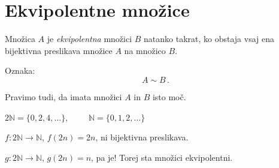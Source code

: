 \documentclass[11pt,paper=b5,footinclude,headinclude]{scrbook} %
\newcounter{example}
\begin{document}
\section{Ekvipolentne množice}

Množica $A$ je {\em ekvipolentna} množici $B$ natanko takrat, ko obstaja vsaj ena bijektivna preslikava
množice $A$ na množico $B$.

Oznaka: $$A\sim B\,.$$

Pravimo tudi, da imata množici $A$ in $B$ isto moč.

\bigskip

\begin{example*}

$2\mathbb{N} = \{0,2,4,\ldots\}$,~~~~~$\mathbb{N} = \{0,1,2,\ldots\}$

$f: 2\mathbb{N} \to \mathbb{N}$, $f(2n) = 2n$, ni bijektivna preslikava.

$g: 2\mathbb{N} \to \mathbb{N}$, $g(2n) = n$, pa je! Torej sta množici ekvipolentni.\end{example*}

\bigskip
\end{document}
